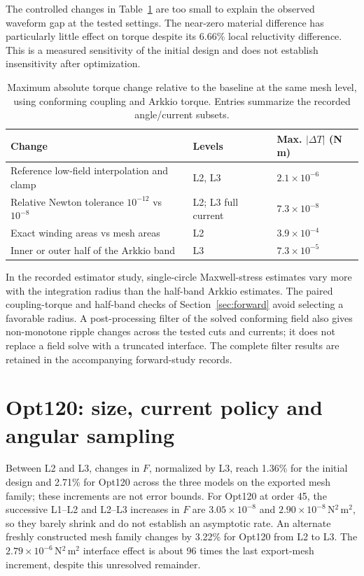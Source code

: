 \documentclass{anvil-paper}
\begin{document}
The controlled changes in Table~\ref{tab:sensitivity} are too small to
explain the observed waveform gap at the tested settings. The near-zero
material difference has particularly little effect on torque despite its
6.66\% local reluctivity difference. This is a measured sensitivity of
the initial design and does not establish insensitivity after optimization.

\begin{table}[H]\centering\small
\caption{Maximum absolute torque change relative to the baseline at the
same mesh level, using conforming coupling and Arkkio torque. Entries
summarize the recorded angle/current subsets.}
\label{tab:sensitivity}
\begin{tabular}{p{.48\linewidth}ll}\toprule
Change & Levels & Max. $|\Delta T|$ (N\,m)\\\midrule
Reference low-field interpolation and clamp & L2, L3 & $2.1\times10^{-6}$\\
Relative Newton tolerance $10^{-12}$ vs $10^{-8}$ & L2; L3 full current & $7.3\times10^{-8}$\\
Exact winding areas vs mesh areas & L2 & $3.9\times10^{-4}$\\
Inner or outer half of the Arkkio band & L3 & $7.3\times10^{-5}$\\
\bottomrule\end{tabular}
\end{table}

In the recorded estimator study, single-circle Maxwell-stress estimates
vary more with the integration radius than the half-band Arkkio estimates.
The paired coupling-torque and half-band checks of
Section~\ref{sec:forward} avoid selecting a favorable radius. A
post-processing filter of the solved conforming field also gives
non-monotone ripple changes across the tested cuts and currents; it does
not replace a field solve with a truncated interface. The complete filter
results are retained in the accompanying forward-study records.

\section{Opt120: size, current policy and angular sampling}\label{sec:opt120-policy}
Between L2 and L3, changes in
$F$, normalized by L3, reach 1.36\% for the initial design and 2.71\%
for Opt120 across the three models on the exported mesh family; these increments are not error bounds.
For Opt120 at order 45, the successive L1--L2 and L2--L3 increases in $F$
are $3.05\times10^{-8}$ and $2.90\times10^{-8}$\,N$^2$\,m$^2$,
so they barely shrink and do not establish an asymptotic rate. An alternate
freshly constructed mesh family changes by 3.22\% for Opt120 from L2 to L3.
The $2.79\times10^{-6}$\,N$^2$\,m$^2$ interface effect is about
96 times the last export-mesh increment, despite this unresolved remainder.
\end{document}
